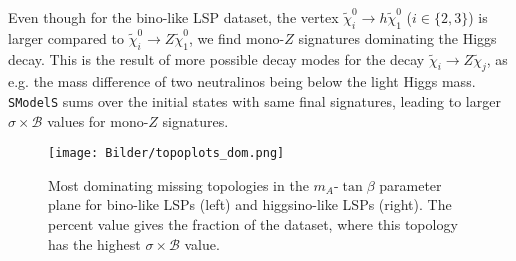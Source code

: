 \documentclass[11pt,a4paper]{article}
\begin{document}
Even though for the bino-like LSP dataset, the vertex $\tilde{\chi}_i^0\rightarrow h\tilde{\chi}_1^0$ ($i \in \lbrace 2,3\rbrace$) is larger compared to $\tilde{\chi}_i^0\rightarrow Z\tilde{\chi}_1^0$, we find mono-$Z$ signatures dominating the Higgs decay. This is the result of more possible decay modes for the decay $\tilde{\chi}_i\rightarrow Z\tilde{\chi}_j$, as e.g. the mass difference of two neutralinos being below the light Higgs mass. \texttt{SModelS} sums over the initial states with same final signatures, leading to larger $\sigma\times\mathcal{B}$ values for mono-$Z$ signatures.

\begin{figure}[h]
\centering
\texttt{[image: Bilder/topoplots\_dom.png]}
\caption{Most dominating missing topologies in the $m_A$-$\tan\beta$ parameter plane for bino-like LSPs (left) and higgsino-like LSPs (right). The percent value gives the fraction of the dataset, where this topology has the highest $\sigma\times\mathcal{B}$ value.}\label{fig_dom}
\end{figure}
\end{document}
